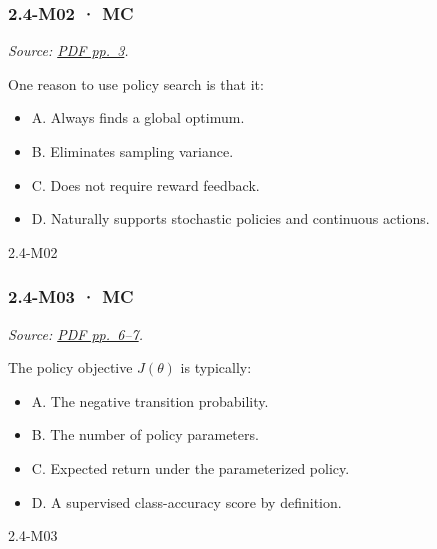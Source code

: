 \noindent\begin{minipage}{\linewidth}

\subsubsection{2.4-M02 · MC}\label{m02-mc-6}

\emph{Source:
\href{../Lecture\%20Slides/2.4.\%20Policy\%20Search.pdf\#page=3}{PDF
pp.~3}.}

One reason to use policy search is that it:

\begin{itemize}
\tightlist
\item
  A. Always finds a global optimum.
\item
  B. Eliminates sampling variance.
\item
  C. Does not require reward feedback.
\item
  D. Naturally supports stochastic policies and continuous actions.
\end{itemize}

\begin{solution}[8mm]{2.4-M02}

\end{solution}
\end{minipage}\par\medskip

\noindent\begin{minipage}{\linewidth}

\subsubsection{2.4-M03 · MC}\label{m03-mc-6}

\emph{Source:
\href{../Lecture\%20Slides/2.4.\%20Policy\%20Search.pdf\#page=6}{PDF
pp.~6--7}.}

The policy objective \(J(\theta)\) is typically:

\begin{itemize}
\tightlist
\item
  A. The negative transition probability.
\item
  B. The number of policy parameters.
\item
  C. Expected return under the parameterized policy.
\item
  D. A supervised class-accuracy score by definition.
\end{itemize}

\begin{solution}[8mm]{2.4-M03}

\end{solution}
\end{minipage}\par\medskip


